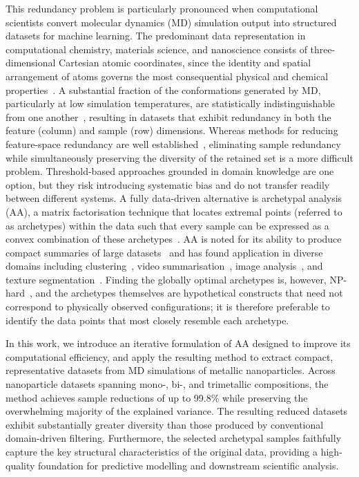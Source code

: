\documentclass{WileyMSP-template}
\begin{document}
This redundancy problem is particularly pronounced when computational scientists convert molecular dynamics (MD) simulation output into structured datasets for machine learning. The predominant data representation in computational chemistry, materials science, and nanoscience consists of three-dimensional Cartesian atomic coordinates, since the identity and spatial arrangement of atoms governs the most consequential physical and chemical properties~\cite{Kim20203Datom}. A substantial fraction of the conformations generated by MD, particularly at low simulation temperatures, are statistically indistinguishable from one another~\cite{Koga2004NPthermalStability}, resulting in datasets that exhibit redundancy in both the feature (column) and sample (row) dimensions. Whereas methods for reducing feature-space redundancy are well established~\cite{Li2017featSelect}, eliminating sample redundancy while simultaneously preserving the diversity of the retained set is a more difficult problem. Threshold-based approaches grounded in domain knowledge are one option, but they risk introducing systematic bias and do not transfer readily between different systems. A fully data-driven alternative is archetypal analysis (AA), a matrix factorisation technique that locates extremal points (referred to as archetypes) within the data such that every sample can be expressed as a convex combination of these archetypes~\cite{Cutler1994AA}. AA is noted for its ability to produce compact summaries of large datasets~\cite{Abrol2020GeomAA} and has found application in diverse domains including clustering~\cite{Morup2012kernelAA}, video summarisation~\cite{Yale2015AAvideoSum}, image analysis~\cite{Hinrich2016AAimAna}, and texture segmentation~\cite{Cabero2019AAtextureSegment}. Finding the globally optimal archetypes is, however, NP-hard~\cite{Aloise2009AANPhard}, and the archetypes themselves are hypothetical constructs that need not correspond to physically observed configurations; it is therefore preferable to identify the data points that most closely resemble each archetype.

In this work, we introduce an iterative formulation of AA designed to improve its computational efficiency, and apply the resulting method to extract compact, representative datasets from MD simulations of metallic nanoparticles. Across nanoparticle datasets spanning mono-, bi-, and trimetallic compositions, the method achieves sample reductions of up to 99.8\% while preserving the overwhelming majority of the explained variance. The resulting reduced datasets exhibit substantially greater diversity than those produced by conventional domain-driven filtering. Furthermore, the selected archetypal samples faithfully capture the key structural characteristics of the original data, providing a high-quality foundation for predictive modelling and downstream scientific analysis.
\end{document}
